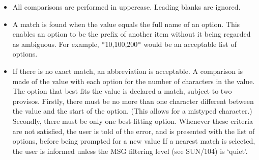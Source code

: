 \documentclass[twoside,11pt]{article}
\newcommand{\xref}[3]{#1}
\newcommand{\latex}[1]{#1}
\begin{document}
{{      \begin{itemize}
         \item All comparisons are performed in uppercase.  Leading blanks
         are ignored.
         \item A match is found when the value equals the full name of an
         option.  This enables an option to be the prefix of another
         item without it being regarded as ambiguous.  For example,
         {\tt "}10,100,200{\tt "} would be an acceptable list of options.
         \item If there is no exact match, an abbreviation is acceptable.
         A comparison is made of the value with each option for the
         number of characters in the value.  The option that best fits
         the value is declared a match, subject to two provisos.
         Firstly, there must be no more than one character different
         between the value and the start of the option.  (This allows
         for a mistyped character.)  Secondly, there must be only one
         best-fitting option.  Whenever these criteria are not
         satisfied, the user is told of the error, and is presented
         with the list of options, before being prompted for a new value
         If a nearest match is selected, the user is informed unless the
\xref{MSG filtering level}{sun104}{conditional_message_reporting}
\latex{ (see SUN/104)} is `quiet'.
         \end{itemize}
   }
}
\end{document}
